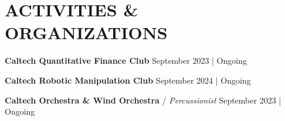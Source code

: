 \documentclass[letterpaper,10pt]{extarticle}
\begin{document}
\section*{ACTIVITIES \& ORGANIZATIONS}
\noindent \textbf{Caltech Quantitative Finance Club} \hfill September 2023 | Ongoing

\noindent \textbf{Caltech Robotic Manipulation Club} \hfill September 2024 | Ongoing

\noindent \textbf{Caltech Orchestra \& Wind Orchestra} / \textit{Percussionist} \hfill September 2023 | Ongoing


\end{document}
